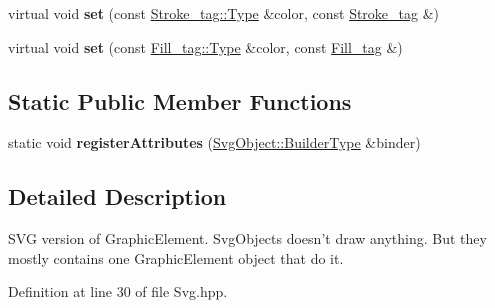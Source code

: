 \begin{DoxyCompactItemize}
\item 
\hypertarget{classsambag_1_1disco_1_1svg_1_1_svg_object_aab0b180e22a531e6a125753c82eebd4f}{
virtual void {\bfseries set} (const \hyperlink{structsambag_1_1com_1_1_color_r_g_b_a}{Stroke\_\-tag::Type} \&color, const \hyperlink{structsambag_1_1disco_1_1svg_1_1_svg_object_1_1_stroke__tag}{Stroke\_\-tag} \&)}
\label{classsambag_1_1disco_1_1svg_1_1_svg_object_aab0b180e22a531e6a125753c82eebd4f}

\item 
\hypertarget{classsambag_1_1disco_1_1svg_1_1_svg_object_ab4bf18768e274d7382ac0bcc5603bbd8}{
virtual void {\bfseries set} (const \hyperlink{structsambag_1_1com_1_1_color_r_g_b_a}{Fill\_\-tag::Type} \&color, const \hyperlink{structsambag_1_1disco_1_1svg_1_1_svg_object_1_1_fill__tag}{Fill\_\-tag} \&)}
\label{classsambag_1_1disco_1_1svg_1_1_svg_object_ab4bf18768e274d7382ac0bcc5603bbd8}

\end{DoxyCompactItemize}
\subsection*{Static Public Member Functions}
\begin{DoxyCompactItemize}
\item 
\hypertarget{classsambag_1_1disco_1_1svg_1_1_svg_object_a3491876592666a552c937661cc21aca0}{
static void {\bfseries registerAttributes} (\hyperlink{classsambag_1_1xml_1_1_x_m_l2_object}{SvgObject::BuilderType} \&binder)}
\label{classsambag_1_1disco_1_1svg_1_1_svg_object_a3491876592666a552c937661cc21aca0}

\end{DoxyCompactItemize}


\subsection{Detailed Description}
SVG version of GraphicElement. SvgObjects doesn't draw anything. But they mostly contains one GraphicElement object that do it. 

Definition at line 30 of file Svg.hpp.



